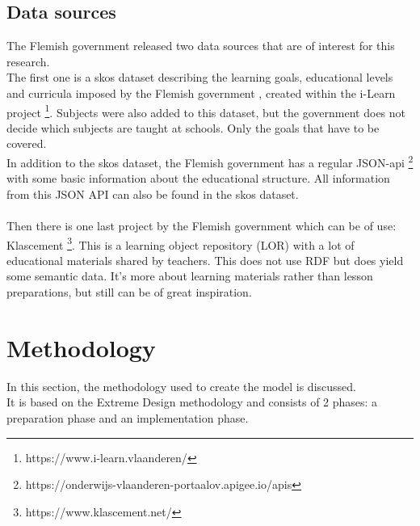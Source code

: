\documentclass[a4paper]{report}
\begin{document}
    \section{Data sources}
    The Flemish government released two data sources that are of interest for this research.\\
    The first one is a skos dataset describing the learning goals, educational levels and curricula imposed by the Flemish government \cite{ilearnskosmos}, created within the i-Learn project \footnote{https://www.i-learn.vlaanderen/}. 
    Subjects were also added to this dataset, but the government does not decide which subjects are taught at schools. Only the goals that have to be covered. \\
    In addition to the skos dataset, the Flemish government has a regular JSON-api \footnote{https://onderwijs-vlaanderen-portaalov.apigee.io/apis} with some basic information about the educational structure.
    All information from this JSON API can also be found in the skos dataset. \\ \\
    Then there is one last project by the Flemish government which can be of use: Klascement \footnote{https://www.klascement.net/}. This is a learning object repository (LOR) with a lot of educational materials shared by teachers.
    This does not use RDF but does yield some semantic data. It's more about learning materials rather than lesson preparations, but still can be of great inspiration. 
    
    \chapter{Methodology}
    \label{section:methodology}
    In this section, the methodology used to create the model is discussed.\\ 
    It is based on the Extreme Design methodology \cite{xd} and consists of 2 phases: a preparation phase and an implementation phase.
\end{document}

